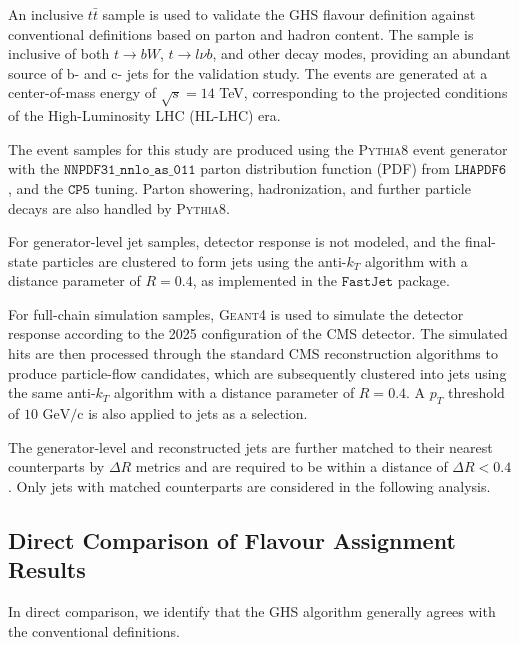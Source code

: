 \documentclass[10pt,twocolumn]{article}
\begin{document}
An inclusive $t\bar{t}$ sample is used to validate the GHS flavour definition against conventional definitions based on parton and hadron content. The sample is inclusive of both $t \to bW$, $t \to l\nu b$, and other decay modes, providing an abundant source of b- and c- jets for the validation study. The events are generated at a center-of-mass energy of $\sqrt{s} = 14$ TeV, corresponding to the projected conditions of the High-Luminosity LHC (HL-LHC) era.

The event samples for this study are produced using the \textsc{Pythia8} event generator \cite{PYTHIA_8_2, PYTHIA_8_3} with the $\texttt{NNPDF31\_nnlo\_as\_011}$ parton distribution function (PDF) from $\texttt{LHAPDF6}$ \cite{NNPDF_3_1_2017, LHAPDF6_2015, LES_HOUCHES_2013_LHAPDF}, and the $\texttt{CP5}$ tuning. Parton showering, hadronization, and further particle decays are also handled by \textsc{Pythia8}.

For generator-level jet samples, detector response is not modeled, and the final-state particles are clustered to form jets using the anti-$k_T$ algorithm with a distance parameter of $R = 0.4$, as implemented in the $\texttt{FastJet}$ package\cite{ANTIKT_2008}.

For full-chain simulation samples, \textsc{Geant4} is used to simulate the detector response according to the 2025 configuration of the CMS detector.\cite{GEANT4}\cite{GEANT4_DEV, GEANT4_DEV_APP} The simulated hits are then processed through the standard CMS reconstruction algorithms to produce particle-flow candidates, which are subsequently clustered into jets using the same anti-$k_T$ algorithm with a distance parameter of $R = 0.4$. A $p_T$ threshold of $10\text{ GeV/c}$ is also applied to jets as a selection.

The generator-level and reconstructed jets are further matched to their nearest counterparts by $\Delta R$ metrics and are required to be within a distance of $\Delta R < 0.4$. Only jets with matched counterparts are considered in the following analysis.

\subsection{Direct Comparison of Flavour Assignment Results} %
\label{sec:vali-matrix}

In direct comparison, we identify that the GHS algorithm generally agrees with the conventional definitions.
\end{document}
